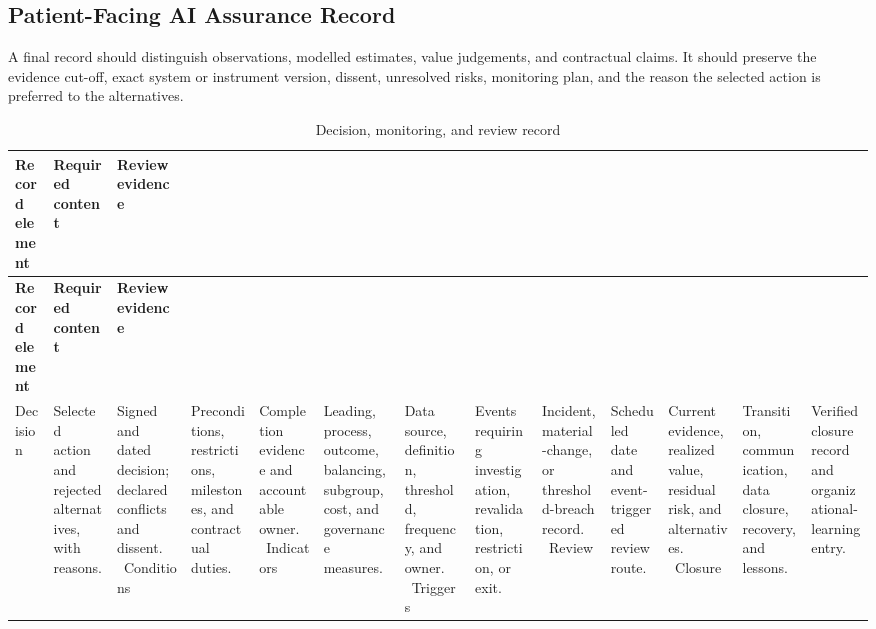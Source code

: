 \subsection{Patient-Facing AI Assurance Record}
\label{sec:comp-ch10-supp-3}
A final record should distinguish observations, modelled estimates, value
judgements, and contractual claims. It should preserve the evidence cut-off, exact
system or instrument version, dissent, unresolved risks, monitoring plan, and the
reason the selected action is preferred to the alternatives.

\begin{longtable}{@{}p{}p{}p{}@{}}
\caption{Decision, monitoring, and review record}
\label{tab:comp-ch10-decision-record}\\
\toprule
\textbf{Record element} & \textbf{Required content} & \textbf{Review evidence} \\
\midrule
\endfirsthead
\toprule
\textbf{Record element} & \textbf{Required content} & \textbf{Review evidence} \\
\midrule
\endhead
\bottomrule
\endlastfoot
Decision & Selected action and rejected alternatives, with reasons. & Signed and dated decision; declared conflicts and dissent. \
Conditions & Preconditions, restrictions, milestones, and contractual duties. & Completion evidence and accountable owner. \
Indicators & Leading, process, outcome, balancing, subgroup, cost, and governance measures. & Data source, definition, threshold, frequency, and owner. \
Triggers & Events requiring investigation, revalidation, restriction, or exit. & Incident, material-change, or threshold-breach record. \
Review & Scheduled date and event-triggered review route. & Current evidence, realized value, residual risk, and alternatives. \
Closure & Transition, communication, data closure, recovery, and lessons. & Verified closure record and organizational-learning entry. \
\end{longtable}
